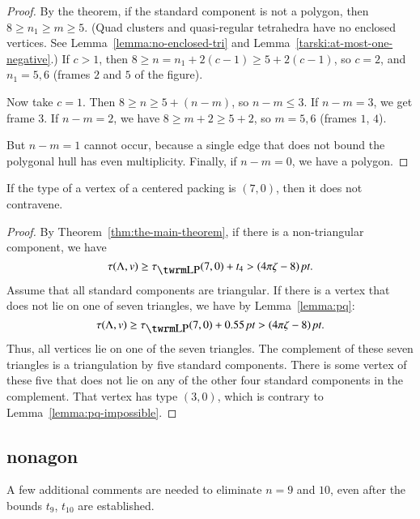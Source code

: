 \begin{proof}
By the theorem, if the standard component is not a polygon, then $8\ge
n_1\ge m\ge 5$. (Quad clusters and quasi-regular tetrahedra have no
enclosed vertices. See Lemma~\ref{lemma:no-enclosed-tri} and
Lemma~\ref{tarski:at-most-one-negative}.) If $c>1$, then $8\ge
n=n_1+2(c-1)\ge 5+2(c-1)$, so $c=2$, and $n_1=5,6$ (frames $2$ and $5$
of the figure).

Now take $c=1$.    Then $8\ge n\ge 5+(n-m)$, so $n-m\le 3$.  If $n-m=3$,
we get frame $3$. If $n-m=2$, we have $8\ge m+2\ge 5+2$, so $m=5,6$
(frames $1$, $4$).

But $n-m=1$ cannot occur, because a single edge that does not bound the
polygonal hull has even multiplicity.  Finally, if $n-m=0$, we have a
polygon.
\end{proof}

\begin{corollary} \label{lemma:70}
If the type of a vertex of a centered packing is $(7,0)$, then it
does not contravene.
\end{corollary}

\begin{proof} By Theorem~\ref{thm:the-main-theorem},
if there is a non-triangular component, we have
    $$\tau(\Lambda,v)\ge\tlp(7,0)+t_4>\squander.$$
Assume that all standard components are triangular.  If there is a
vertex that does not lie on one of seven triangles, we have by
Lemma~\ref{lemma:pq}:
    $$\tau(\Lambda,v)\ge\tlp(7,0)+0.55\,\pt>\squander.$$
Thus, all vertices lie on one of the seven triangles.  The
complement of these seven triangles is a  triangulation by
five standard components.  There is some vertex of these five that does
not lie on any of the other four standard components in the complement.
That vertex has type $(3,0)$, which is contrary to
Lemma~\ref{lemma:pq-impossible}.
\end{proof}

\subsection{nonagon} %
    \label{sec:nonagon}

A few additional comments are needed to eliminate $n=9$ and $10$,
even after the bounds $t_9$, $t_{10}$ are established.

